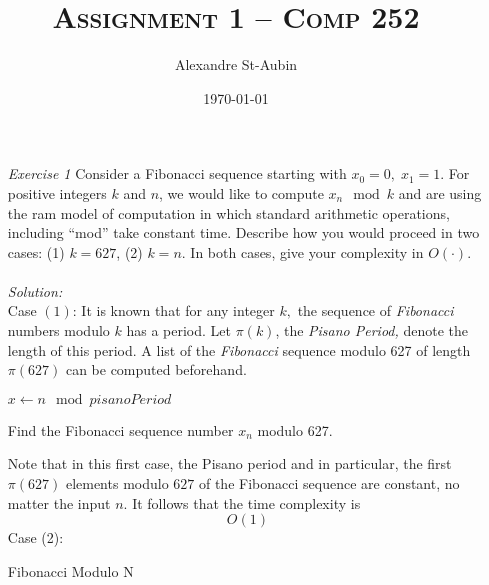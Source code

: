\documentclass[12pt]{article}
\title{\textsc{Assignment 1 -- Comp 252}}
\author{Alexandre St-Aubin}
\date{\today}
\theoremstyle{definition}
\theoremstyle{remark}
\newcommand\sol{%
  \\ 
  \\
  \textit{Solution:}\\%
}
\begin{document}
\maketitle 
\begin{enumerate}
  \item[\it Exercise 1] Consider a Fibonacci sequence starting with $x_0 = 0,\; x_1 = 1$. For positive integers $k$ and $n$, we would like to compute $x_n \mod k$ and are using the ram model of computation in which standard arithmetic operations, including “mod” take constant time. Describe how you would proceed in two cases: (1) $k = 627$, (2) $k = n$. In both cases, give your complexity in $O(\cdot)$.
  \sol  
  Case $(1)$: It is known that for any integer $k,$ the sequence of \textit{Fibonacci} numbers modulo $k$ has a period. Let $\pi (k)$, the \textit{Pisano Period, }denote the length of this period. A list of the \textit{Fibonacci} sequence modulo 627 of length $\pi (627)$ can be computed beforehand. 

\IncMargin{1em}
\begin{algorithm}
\BlankLine
  {$x \leftarrow n \mod pisanoPeriod$}
\caption{Find the Fibonacci sequence number $x_n$ modulo 627. }\label{algo_disjdecomp}
\end{algorithm}\DecMargin{1em}
  Note that in this first case, the Pisano period and in particular, the first $\pi (627)$ elements modulo $627$ of the Fibonacci sequence are constant, no matter the input $n$. It follows that the time complexity is 
  $$O(1) $$
  Case (2): 

\begin{algorithm}
  \caption{Fibonacci Modulo N}\label{algo:fibonacci_modulo_n}

\BlankLine
{}
\end{algorithm}
\end{enumerate}
\end{document}
